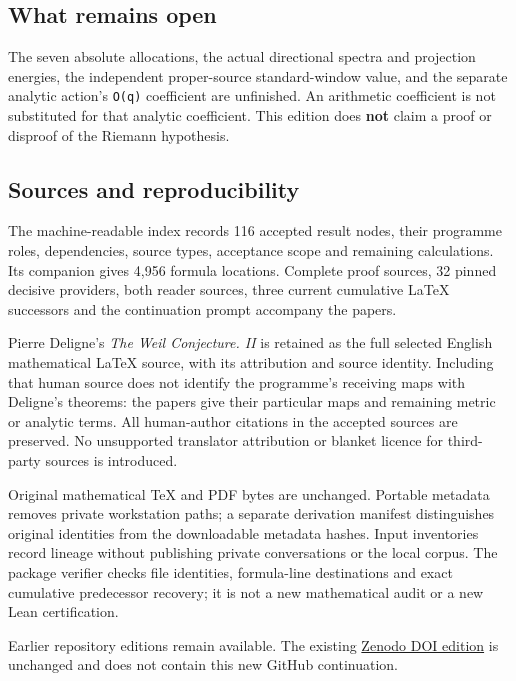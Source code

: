 \documentclass[
]{article}
\begin{document}
\subsection{What remains open}\label{what-remains-open}

The seven absolute allocations, the actual directional spectra and
projection energies, the independent proper-source standard-window
value, and the separate analytic action's \texttt{O(q)} coefficient are
unfinished. An arithmetic coefficient is not substituted for that
analytic coefficient. This edition does \textbf{not} claim a proof or
disproof of the Riemann hypothesis.

\subsection{Sources and
reproducibility}\label{sources-and-reproducibility}

The machine-readable index records 116 accepted result nodes, their
programme roles, dependencies, source types, acceptance scope and
remaining calculations. Its companion gives 4,956 formula locations.
Complete proof sources, 32 pinned decisive providers, both reader
sources, three current cumulative LaTeX successors and the continuation
prompt accompany the papers.

Pierre Deligne's \emph{The Weil Conjecture. II} is retained as the full
selected English mathematical LaTeX source, with its attribution and
source identity. Including that human source does not identify the
programme's receiving maps with Deligne's theorems: the papers give
their particular maps and remaining metric or analytic terms. All
human-author citations in the accepted sources are preserved. No
unsupported translator attribution or blanket licence for third-party
sources is introduced.

Original mathematical TeX and PDF bytes are unchanged. Portable metadata
removes private workstation paths; a separate derivation manifest
distinguishes original identities from the downloadable metadata hashes.
Input inventories record lineage without publishing private
conversations or the local corpus. The package verifier checks file
identities, formula-line destinations and exact cumulative predecessor
recovery; it is not a new mathematical audit or a new Lean
certification.

Earlier repository editions remain available. The existing
\href{https://doi.org/10.5281/zenodo.22821108}{Zenodo DOI edition} is
unchanged and does not contain this new GitHub continuation.
\end{document}

